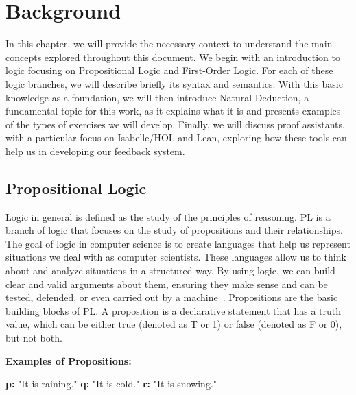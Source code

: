 
%

\chapter{Background}
\label{chap:back}
In this chapter, we will provide the necessary context to understand the main concepts explored throughout this document. We begin with an introduction to logic focusing on Propositional Logic and First-Order Logic. For each of these logic branches, we will describe briefly its syntax and semantics. With this basic knowledge as a foundation, we will then introduce Natural Deduction, a fundamental topic for this work, as it explains what it is and presents examples of the types of exercises we will develop. Finally, we will discuss proof assistants, with a particular focus on Isabelle/HOL and Lean, exploring how these tools can help us in developing our feedback system.

\section{Propositional Logic}
\label{chap:prop}
Logic in general is defined as the study of the principles of reasoning. \gls{PL} is a branch of logic that focuses on the study of propositions and their relationships. The goal of logic in computer science is to create languages that help us represent situations we deal with as computer scientists. These languages allow us to think about and analyze situations in a structured way. By using logic, we can build clear and valid arguments about them, ensuring they make sense and can be tested, defended, or even carried out by a machine~\cite{huth_2004_logic}. Propositions are the basic building blocks of \gls{PL}. A proposition is a declarative statement that has a truth value, which can be either true (denoted as T or 1) or false (denoted as F or 0), but not both.

\textbf{Examples of Propositions:}
\begin{center}
    \textbf{p:} "It is raining." \quad \textbf{q:} "It is cold." \quad \textbf{r:} "It is snowing."
\end{center}

